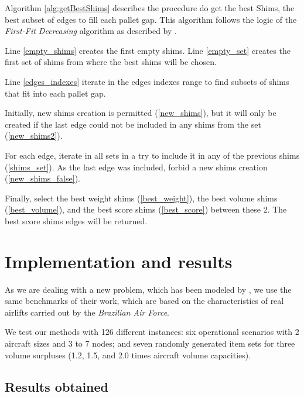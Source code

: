 \documentclass[preprint,authoryear]{elsarticle}
\begin{document}
Algorithm \ref{alg:getBestShims} describes the procedure do get the best Shims, the best subset of edges to fill each pallet gap. This algorithm follows the logic of the {\it First-Fit Decreasing} algorithm as described by \cite{JohnsonGarey1985}.

Line \ref{empty_shims} creates the first empty shims.
Line \ref{empty_set} creates the first set of shims from where the best shims will be chosen.

Line \ref{edges_indexes} iterate in the edges indexes range to find subsets of shims that fit into each pallet gap.

Initially, new shims creation is permitted (\ref{new_shims}), but it will only be created if the last edge could not be included in any shims from the set (\ref{new_shims2}). 

For each edge, iterate in all sets in a try to include it in any of the previous shims (\ref{shims_set}).
As the last edge was included, forbid a new shims creation (\ref{new_shims_false}).

Finally, select the best weight shims (\ref{best_weight}), the best volume shims (\ref{best_volume}), and the best score shims (\ref{best_score}) between these 2. The best score shims edges will be returned.

\section{Implementation and results}
\label{sec6}


As we are dealing with a new problem, which has been modeled by \cite{MesquitaSanches2023}, we use the same benchmarks of their work, which are based on the characteristics of real airlifts carried out by the {\em Brazilian Air Force}.
 
We test our methods with 126 different instances: six operational scenarios with 2 aircraft sizes and 3 to 7 nodes; and seven randomly generated item sets for three volume surpluses (1.2, 1.5, and 2.0 times aircraft volume capacities).


\subsection{Results obtained}



\end{document}
